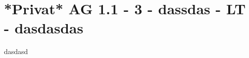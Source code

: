 \section{*Privat* AG 1.1 - 3 - dassdas - LT - dasdasdas}

\begin{beispiel}[AG 1.1]{1}
dasdasd
\end{beispiel}